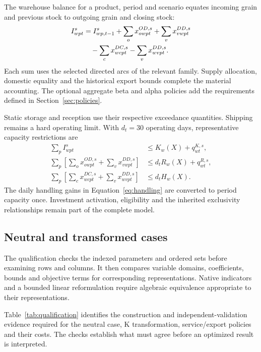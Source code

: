\documentclass[11pt,a4paper]{article}
\begin{document}
The warehouse balance for a product, period and scenario equates incoming grain and previous stock to outgoing grain and closing stock:
\begin{align}
 I^s_{wpt}
 &=I^s_{wp,t-1}+\sum_o x^{OD,s}_{owpt}
   +\sum_v x^{DD,s}_{vwpt} \notag\\
 &\quad-\sum_c x^{DC,s}_{wcpt}-\sum_v x^{DD,s}_{wvpt}.
 \label{eq:warehousebalance}
\end{align}
Each sum uses the selected directed arcs of the relevant family. Supply allocation, domestic equality and the historical export bounds complete the material accounting. The optional aggregate beta and alpha policies add the requirements defined in Section~\ref{sec:policies}.

Static storage and reception use their respective exceedance quantities. Shipping remains a hard operating limit. With $d_t=30$ operating days, representative capacity restrictions are
\begin{align}
 \sum_p I^s_{wpt}&\le K_w(X)+q^{K,s}_{wt},\\
 \sum_p\left[\sum_o x^{OD,s}_{owpt}
             +\sum_v x^{DD,s}_{vwpt}\right]
   &\le d_t R_w(X)+q^{R,s}_{wt},\\
 \sum_p\left[\sum_c x^{DC,s}_{wcpt}
             +\sum_v x^{DD,s}_{wvpt}\right]
   &\le d_t H_w(X).
\end{align}
The daily handling gains in Equation~\ref{eq:handling} are converted to period capacity once. Investment activation, eligibility and the inherited exclusivity relationships remain part of the complete model.

\subsection{Neutral and transformed cases}

The qualification checks the indexed parameters and ordered sets before examining rows and columns. It then compares variable domains, coefficients, bounds and objective terms for corresponding representations. Native indicators and a bounded linear reformulation require algebraic equivalence appropriate to their representations.

Table~\ref{tab:qualification} identifies the construction and independent-validation evidence required for the neutral case, K transformation, service/export policies and their costs. The checks establish what must agree before an optimized result is interpreted.
\end{document}

